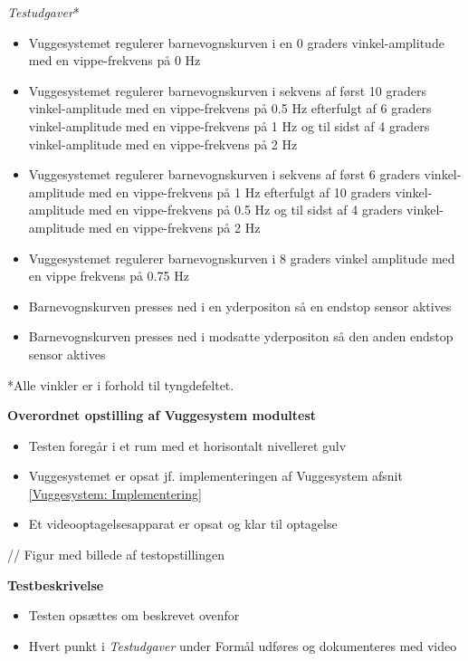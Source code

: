 \textit{Testudgaver}*
\begin{itemize}
	\item Vuggesystemet regulerer barnevognskurven i en 0 graders vinkel-amplitude med en vippe-frekvens på 0 Hz
	\item Vuggesystemet regulerer barnevognskurven i sekvens af først 10 graders vinkel-amplitude med en vippe-frekvens på 0.5 Hz efterfulgt af 6 graders vinkel-amplitude med en vippe-frekvens på 1 Hz og til sidst af 4 graders vinkel-amplitude med en vippe-frekvens på 2 Hz
	\item Vuggesystemet regulerer barnevognskurven i sekvens af først 6 graders vinkel-amplitude med en vippe-frekvens på 1 Hz efterfulgt af 10 graders vinkel-amplitude med en vippe-frekvens på 0.5 Hz og til sidst af 4 graders vinkel-amplitude med en vippe-frekvens på 2 Hz
	\item Vuggesystemet regulerer barnevognskurven i 8 graders vinkel amplitude med en vippe frekvens på 0.75 Hz
	\item Barnevognskurven presses ned i en yderpositon så en endstop sensor aktives
	\item Barnevognskurven presses ned i modsatte yderpositon så den anden endstop sensor aktives
\end{itemize}
*Alle vinkler er i forhold til tyngdefeltet.


\textbf{Overordnet opstilling af Vuggesystem modultest}

\begin{itemize}
	\item Testen foregår i et rum med et horisontalt nivelleret gulv
	\item Vuggesystemet er opsat jf. implementeringen af Vuggesystem afsnit \ref{Vuggesystem: Implementering}
	\item Et videooptagelsesapparat er opsat og klar til optagelse
\end{itemize}
// Figur med billede af testopstillingen

\textbf{Testbeskrivelse}
\begin{itemize}
	\item Testen opsættes om beskrevet ovenfor
	\item Hvert punkt i \textit{Testudgaver} under Formål udføres og dokumenteres med video
\end{itemize}

